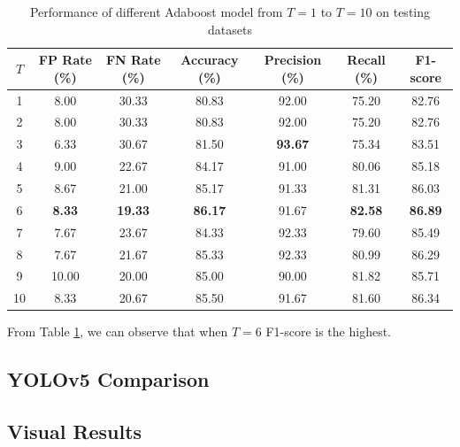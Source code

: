 \documentclass{article}[12pt, twocolumn]
\begin{document}
\begin{table}[]
    \centering
    \caption{Performance of different Adaboost model from $T=1$ to $T=10$ on testing datasets}
    \begin{tabular}{@{}ccccccc@{}}
        \toprule
        $T$  & FP Rate (\%)  & FN Rate (\%)   & Accuracy (\%)  & Precision (\%)   & Recall (\%)      & F1-score  \\ \midrule
        1  & 8.00          & 30.33          & 80.83          & 92.00         & 75.20         & 82.76         \\
        2  & 8.00          & 30.33          & 80.83          & 92.00         & 75.20         & 82.76         \\
        3  & 6.33          & 30.67          & 81.50          & \textbf{93.67} & 75.34         & 83.51         \\
        4  & 9.00          & 22.67          & 84.17          & 91.00         & 80.06         & 85.18         \\
        5  & 8.67          & 21.00          & 85.17          & 91.33         & 81.31         & 86.03         \\
        6  & \textbf{8.33} & \textbf{19.33} & \textbf{86.17} & 91.67         & \textbf{82.58} & \textbf{86.89} \\
        7  & 7.67          & 23.67          & 84.33          & 92.33         & 79.60         & 85.49         \\
        8  & 7.67          & 21.67          & 85.33          & 92.33         & 80.99         & 86.29         \\
        9  & 10.00         & 20.00          & 85.00          & 90.00         & 81.82         & 85.71         \\
        10 & 8.33          & 20.67          & 85.50          & 91.67         & 81.60         & 86.34         \\ \bottomrule
    \end{tabular}
    \label{tab:ada_test}    
\end{table}

From Table \ref{tab:ada_test}, we can observe that when $T=6$ F1-score is the highest. 
\subsection{YOLOv5 Comparison} \label{subsec:yolo_comp}

\subsection{Visual Results}
\end{document}

